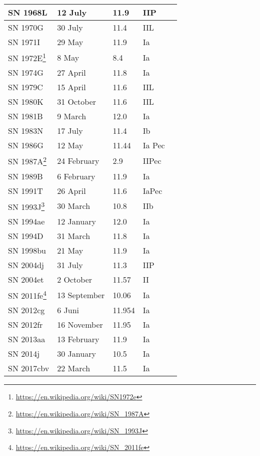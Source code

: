 \begin{longtable}{l|l|l|l|l}
SN 1968L & 12 July      & 11.9  & IIP & \\\midrule
SN 1970G & 30 July      & 11.4  & IIL & \\%
SN 1971I & 29 May       & 11.9  & Ia  & \\%
SN 1972E\footnote{\url{https://en.wikipedia.org/wiki/SN1972e}} & 8 May & 8.4 & Ia & \\%
SN 1974G & 27 April     & 11.8  & Ia  & \\%
SN 1979C & 15 April     & 11.6  & IIL & \\\midrule
SN 1980K & 31 October   & 11.6  & IIL & \\%
SN 1981B &  9 March     & 12.0  & Ia  & \\%
SN 1983N & 17 July      & 11.4  & Ib  & \\%
SN 1986G & 12 May       & 11.44 & Ia Pec & \\%
SN 1987A\footnote{\url{https://en.wikipedia.org/wiki/SN_1987A}} & 24 February & 2.9 & IIPec & \\%
SN 1989B &  6 February  & 11.9  & Ia    & \\\midrule
SN 1991T & 26 April     & 11.6  & IaPec & \\%
SN 1993J\footnote{\url{https://en.wikipedia.org/wiki/SN_1993J}} & 30 March & 10.8 & IIb & \\%
SN 1994ae & 12 January  & 12.0    & Ia  & \\%
SN 1994D  & 31 March    & 11.8    & Ia  & \\%
SN 1998bu & 21 May      & 11.9    & Ia  & \\\midrule
SN 2004dj & 31 July     & 11.3    & IIP & \\%
SN 2004et &  2 October  & 11.57   & II  & \\\midrule
SN 2011fe\footnote{\url{https://en.wikipedia.org/wiki/SN_2011fe}} & 13 September & 10.06 & Ia & \\%
SN 2012cg  &  6 Juni     & 11.954 & Ia & \\%
SN 2012fr  & 16 November & 11.95  & Ia & \\%
SN 2013aa  & 13 February & 11.9   & Ia & \\%
SN 2014j   & 30 January  & 10.5   & Ia & \\%
SN 2017cbv & 22 March    & 11.5   & Ia & \\\bottomrule
\end{longtable}

